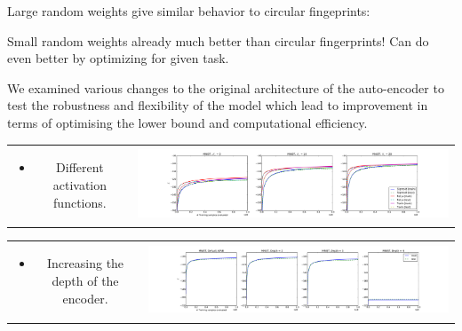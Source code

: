 \documentclass[landscape,a0b,final,a4resizeable]{include/a0poster}
\begin{document}
\begin{poster}
\begin{multicols}{3}
\vspace{0.5em}

\newpage %



Large random weights give similar behavior to circular fingeprints:

\vspace{0.5em}

Small random weights already much better than circular fingerprints!
Can do even better by optimizing for given task.

\vspace{1in}


We examined various changes to the original architecture of the auto-encoder to test the robustness and flexibility of the model which lead to improvement in terms of optimising the lower bound and computational efficiency.

\begin{tabular}{cc}
\begin{minipage}[c]{0.25\columnwidth}
\begin{itemize}
\item Different activation functions.
\end{itemize}
\end{minipage} & 
\begin{minipage}[c]{0.75\columnwidth}
\includegraphics[width=1.0\columnwidth, clip, trim=4mm 0mm 4mm 4mm]{../res/mnist_activations}
\end{minipage}
\end{tabular}

\vspace{0.5em}

\begin{tabular}{cc}
\begin{minipage}[c]{0.25\columnwidth}
\begin{itemize}
\item Increasing the depth of the encoder.
\end{itemize}
\end{minipage} & 
\begin{minipage}[c]{0.75\columnwidth}
\includegraphics[width=1.0\columnwidth, clip, trim=4mm 0mm 4mm 4mm]{../res/mnist_depth}
\end{minipage}
\end{tabular}


\end{multicols}
\end{poster}
\end{document}
